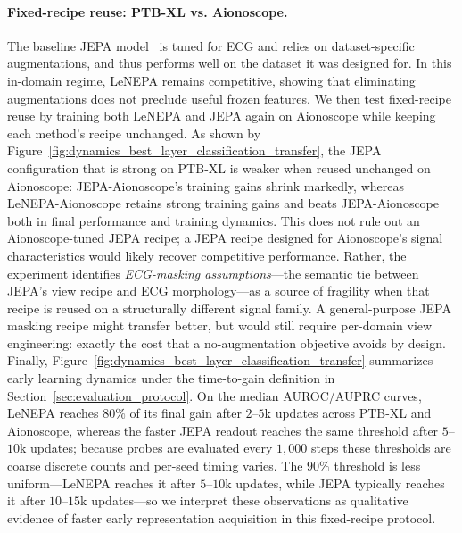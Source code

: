\documentclass[sigconf,anonymous,review]{acmart}
\begin{document}
\paragraph{Fixed-recipe reuse: PTB-XL vs. Aionoscope.}
The baseline JEPA model~\citep{weimann2024jepaecg} is tuned for ECG and relies on dataset-specific augmentations, and thus performs well on the dataset it was designed for.
In this in-domain regime, LeNEPA remains competitive, showing that eliminating augmentations does not preclude useful frozen features.
We then test fixed-recipe reuse by training both LeNEPA and JEPA again on Aionoscope while keeping each method's recipe unchanged.
As shown by Figure~\ref{fig:dynamics_best_layer_classification_transfer}, the JEPA configuration that is strong on PTB-XL is weaker when reused unchanged on Aionoscope: JEPA-Aionoscope's training gains shrink markedly, whereas LeNEPA-Aionoscope retains strong training gains and beats JEPA-Aionoscope both in final performance and training dynamics.
This does not rule out an Aionoscope-tuned JEPA recipe; a JEPA recipe designed for Aionoscope's signal characteristics would likely recover competitive performance. Rather, the experiment identifies \emph{ECG-masking assumptions}---the semantic tie between JEPA's view recipe and ECG morphology---as a source of fragility when that recipe is reused on a structurally different signal family.
A general-purpose JEPA masking recipe might transfer better, but would still require per-domain view engineering: exactly the cost that a no-augmentation objective avoids by design.
Finally, Figure~\ref{fig:dynamics_best_layer_classification_transfer} summarizes early learning dynamics under the time-to-gain definition in Section~\ref{sec:evaluation_protocol}.
On the median AUROC/AUPRC curves, LeNEPA reaches $80\%$ of its final gain after $2$--$5$k updates across PTB-XL and Aionoscope, whereas the faster JEPA readout reaches the same threshold after $5$--$10$k updates; because probes are evaluated every $1{,}000$ steps these thresholds are coarse discrete counts and per-seed timing varies.
The $90\%$ threshold is less uniform---LeNEPA reaches it after $5$--$10$k updates, while JEPA typically reaches it after $10$--$15$k updates---so we interpret these observations as qualitative evidence of faster early representation acquisition in this fixed-recipe protocol.
\end{document}
